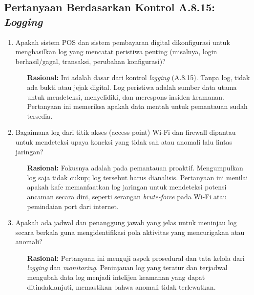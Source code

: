 \documentclass[12pt, a4paper]{report}
\begin{document}
\subsection{Pertanyaan Berdasarkan Kontrol A.8.15: \textit{Logging}}
\begin{enumerate}
    \item Apakah sistem POS dan sistem pembayaran digital dikonfigurasi untuk menghasilkan log yang mencatat peristiwa penting (misalnya, login berhasil/gagal, transaksi, perubahan konfigurasi)?
    \begin{itemize}
        \item[\textbf{Rasional:}] Ini adalah dasar dari kontrol \textit{logging} (A.8.15). Tanpa log, tidak ada bukti atau jejak digital. Log peristiwa adalah sumber data utama untuk mendeteksi, menyelidiki, dan merespons insiden keamanan. Pertanyaan ini memeriksa apakah data mentah untuk pemantauan sudah tersedia.
    \end{itemize}

    \item Bagaimana log dari titik akses (access point) Wi-Fi dan firewall dipantau untuk mendeteksi upaya koneksi yang tidak sah atau anomali lalu lintas jaringan?
    \begin{itemize}
        \item[\textbf{Rasional:}] Fokusnya adalah pada pemantauan proaktif. Mengumpulkan log saja tidak cukup; log tersebut harus dianalisis. Pertanyaan ini menilai apakah kafe memanfaatkan log jaringan untuk mendeteksi potensi ancaman secara dini, seperti serangan \textit{brute-force} pada Wi-Fi atau pemindaian port dari internet.
    \end{itemize}
    
    \item Apakah ada jadwal dan penanggung jawab yang jelas untuk meninjau log secara berkala guna mengidentifikasi pola aktivitas yang mencurigakan atau anomali? \citep{sari2023backup}
    \begin{itemize}
        \item[\textbf{Rasional:}] Pertanyaan ini menguji aspek prosedural dan tata kelola dari \textit{logging} dan \textit{monitoring}. Peninjauan log yang teratur dan terjadwal mengubah data log menjadi intelijen keamanan yang dapat ditindaklanjuti, memastikan bahwa anomali tidak terlewatkan.
    \end{itemize}
\end{enumerate}
\end{document}
